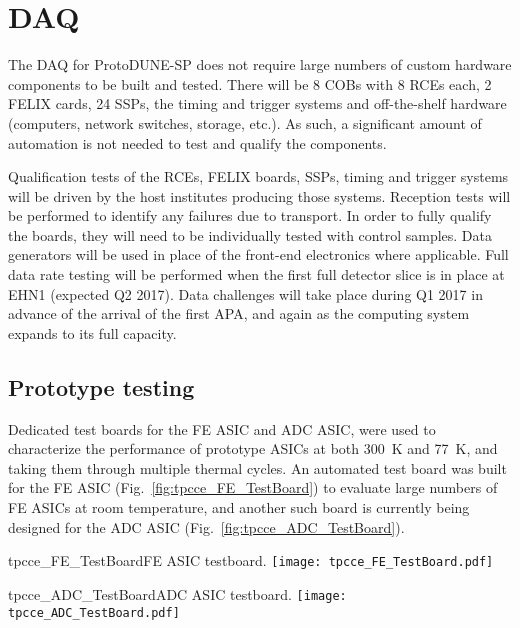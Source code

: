 \section{DAQ}

The DAQ for ProtoDUNE-SP does not require large numbers of custom hardware components to 
be built and tested.  There will be 8 COBs with 8 RCEs each, 2 FELIX cards, 24 SSPs, the timing 
and trigger systems and off-the-shelf hardware (computers, network switches, storage, etc.).
As such, a significant amount of automation is not needed to test and qualify the 
components.  

Qualification tests of the RCEs, FELIX boards, SSPs, timing and trigger systems will
be driven by the host institutes producing those systems.  Reception tests will be 
performed to identify any failures due to transport.  In order to fully qualify the 
boards, they will need to be individually tested with control samples.  Data generators
will be used in place of the front-end electronics where applicable.  Full data rate 
testing will be performed when the first full detector slice is in place at EHN1 (expected
Q2 2017).  Data challenges will take place during Q1 2017 in advance of the arrival of the 
first APA, and again as the computing system expands to its full capacity.

\subsection{Prototype testing}
\label{subsubsec:ce_install_proto}

Dedicated test boards for the FE ASIC and ADC ASIC,
were used to characterize the performance of prototype ASICs at both 300~K and 77~K,
and taking them through multiple thermal cycles.
An automated test board was built for the FE ASIC (Fig.~\ref{fig:tpcce_FE_TestBoard})
to evaluate large numbers of FE ASICs at room temperature,
and another such board is currently being designed for the ADC ASIC (Fig.~\ref{fig:tpcce_ADC_TestBoard}).

\begin{cdrfigure}{tpcce_FE_TestBoard}{FE ASIC testboard.}
\texttt{[image: tpcce\_FE\_TestBoard.pdf]}
\end{cdrfigure}
\begin{cdrfigure}{tpcce_ADC_TestBoard}{ADC ASIC testboard.}
\texttt{[image: tpcce\_ADC\_TestBoard.pdf]}
\end{cdrfigure}


